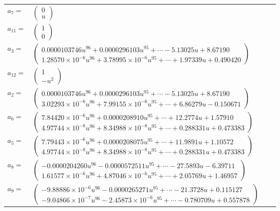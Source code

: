 \documentclass[1p]{elsarticle_modified}
\theoremstyle{definition}
\begin{document}
\begin{tabular}{m{7pt} m{180pt} m{7pt} m{180pt} }
\flushright $a_{7}=$&$\begin{pmatrix}0\\u\end{pmatrix}$ \\
\flushright $a_{11}=$&$\begin{pmatrix}1\\0\end{pmatrix}$ \\
\flushright $a_{3}=$&$\begin{pmatrix}0.0000103746 u^{96}+0.0000296103 u^{95}+\cdots-5.13025 u+8.67190\\1.28570\times10^{-6} u^{96}+3.78995\times10^{-6} u^{95}+\cdots+1.97339 u+0.490420\end{pmatrix}$ \\
\flushright $a_{12}=$&$\begin{pmatrix}1\\- u^2\end{pmatrix}$ \\
\flushright $a_{2}=$&$\begin{pmatrix}0.0000103746 u^{96}+0.0000296103 u^{95}+\cdots-5.13025 u+8.67190\\3.02293\times10^{-6} u^{96}+7.99155\times10^{-6} u^{95}+\cdots+6.86279 u-0.150671\end{pmatrix}$ \\
\flushright $a_{6}=$&$\begin{pmatrix}7.84420\times10^{-6} u^{96}+0.0000208910 u^{95}+\cdots+12.2774 u+1.57910\\4.97744\times10^{-8} u^{96}+8.34988\times10^{-8} u^{95}+\cdots+0.288331 u+0.473383\end{pmatrix}$ \\
\flushright $a_{5}=$&$\begin{pmatrix}7.79443\times10^{-6} u^{96}+0.0000208075 u^{95}+\cdots+11.9891 u+1.10572\\4.97744\times10^{-8} u^{96}+8.34988\times10^{-8} u^{95}+\cdots+0.288331 u+0.473383\end{pmatrix}$ \\
\flushright $a_{8}=$&$\begin{pmatrix}-0.0000204260 u^{96}-0.0000572511 u^{95}+\cdots-27.5893 u-6.39711\\1.61577\times10^{-6} u^{96}+4.87046\times10^{-6} u^{95}+\cdots+2.05769 u+1.46957\end{pmatrix}$ \\
\flushright $a_{9}=$&$\begin{pmatrix}-9.88886\times10^{-6} u^{96}-0.0000265271 u^{95}+\cdots-21.3728 u+0.115127\\-9.04866\times10^{-7} u^{96}-2.45873\times10^{-6} u^{95}+\cdots-0.780709 u+0.557878\end{pmatrix}$ \\

\end{tabular}
\end{document}
